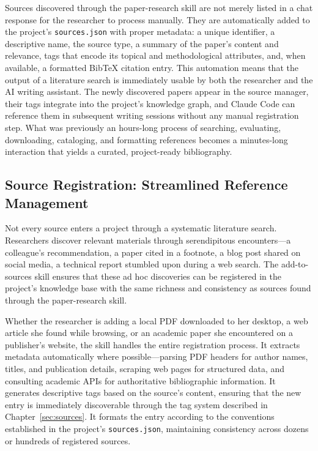 \documentclass[a4paper,11pt]{article}
\begin{document}
Sources discovered through the paper-research skill are not merely listed in a chat response for the researcher to process manually. They are automatically added to the project's \texttt{sources.json} with proper metadata: a unique identifier, a descriptive name, the source type, a summary of the paper's content and relevance, tags that encode its topical and methodological attributes, and, when available, a formatted BibTeX citation entry. This automation means that the output of a literature search is immediately usable by both the researcher and the AI writing assistant. The newly discovered papers appear in the source manager, their tags integrate into the project's knowledge graph, and Claude Code can reference them in subsequent writing sessions without any manual registration step. What was previously an hours-long process of searching, evaluating, downloading, cataloging, and formatting references becomes a minutes-long interaction that yields a curated, project-ready bibliography.

\subsection{Source Registration: Streamlined Reference Management}

Not every source enters a project through a systematic literature search. Researchers discover relevant materials through serendipitous encounters---a colleague's recommendation, a paper cited in a footnote, a blog post shared on social media, a technical report stumbled upon during a web search. The add-to-sources skill ensures that these ad hoc discoveries can be registered in the project's knowledge base with the same richness and consistency as sources found through the paper-research skill.

Whether the researcher is adding a local PDF downloaded to her desktop, a web article she found while browsing, or an academic paper she encountered on a publisher's website, the skill handles the entire registration process. It extracts metadata automatically where possible---parsing PDF headers for author names, titles, and publication details, scraping web pages for structured data, and consulting academic APIs for authoritative bibliographic information. It generates descriptive tags based on the source's content, ensuring that the new entry is immediately discoverable through the tag system described in Chapter~\ref{sec:sources}. It formats the entry according to the conventions established in the project's \texttt{sources.json}, maintaining consistency across dozens or hundreds of registered sources.
\end{document}
